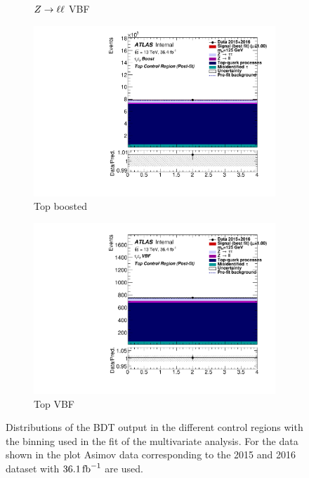 \begin{figure}[htb]
\begin{subfigure}[t]{0.45\textwidth}
        \caption{$Z \to \ell \ell$ VBF}
    \end{subfigure}
    \begin{subfigure}[t]{0.45\textwidth}
        \includegraphics[width=\textwidth]{./plots/fit/mva/top_boost.pdf}
        \caption{Top boosted}
    \end{subfigure}
    \begin{subfigure}[t]{0.45\textwidth}
        \includegraphics[width=\textwidth]{./plots/fit/mva/top_vbf.pdf}
        \caption{Top VBF}
    \end{subfigure}
    \caption{Distributions of the BDT output in the different control regions with the binning used in the fit of the multivariate analysis.
             For the data shown in the plot Asimov data corresponding to the 2015 and 2016 dataset with $\SI{36.1}{\invfb}$ are used.}\label{fig:fit:input:mva:CR}
\end{figure}

